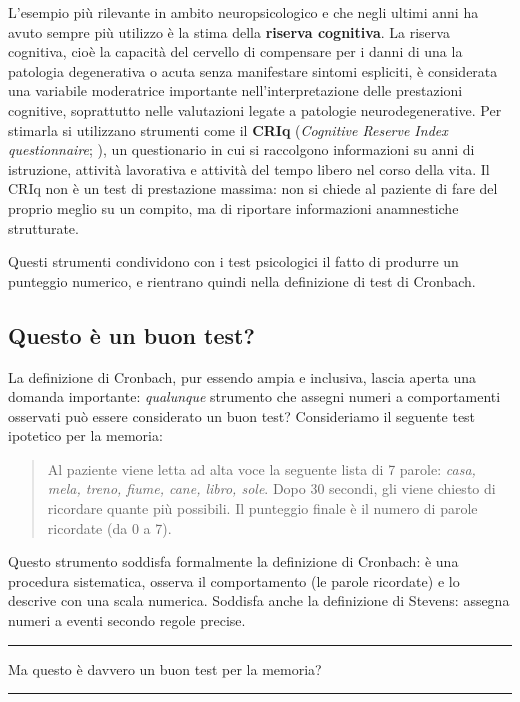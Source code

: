 \documentclass[
  italian,
  letterpaper,
  paper=A4,
  headinclude=on,
  footinclude=on,
  12pt]{scrbook}
\newenvironment{domanda}{%
  \par\medskip\noindent\rule{\linewidth}{0.4pt}\vspace{3pt}%
  \begin{center}\large\itshape
}{%
  \end{center}\vspace{-4pt}\noindent\rule{\linewidth}{0.4pt}\par\medskip
}
\begin{document}
L'esempio più rilevante in ambito neuropsicologico e che negli ultimi
anni ha avuto sempre più utilizzo è la stima della \textbf{riserva
cognitiva}. La riserva cognitiva, cioè la capacità del cervello di
compensare per i danni di una la patologia degenerativa o acuta senza
manifestare sintomi espliciti, è considerata una variabile moderatrice
importante nell'interpretazione delle prestazioni cognitive, soprattutto
nelle valutazioni legate a patologie neurodegenerative. Per stimarla si
utilizzano strumenti come il \textbf{CRIq} (\emph{Cognitive Reserve
Index questionnaire}; \cite{nucci2012cognitive}), un questionario in cui
si raccolgono informazioni su anni di istruzione, attività lavorativa e
attività del tempo libero nel corso della vita. Il CRIq non è un test di
prestazione massima: non si chiede al paziente di fare del proprio
meglio su un compito, ma di riportare informazioni anamnestiche
strutturate.

Questi strumenti condividono con i test psicologici il fatto di produrre
un punteggio numerico, e rientrano quindi nella definizione di test di
Cronbach.

\subsection{Questo è un buon test?}\label{questo-uxe8-un-buon-test}

La definizione di Cronbach, pur essendo ampia e inclusiva, lascia aperta
una domanda importante: \emph{qualunque} strumento che assegni numeri a
comportamenti osservati può essere considerato un buon test?
Consideriamo il seguente test ipotetico per la memoria:

\begin{quote}
Al paziente viene letta ad alta voce la seguente lista di 7 parole:
\emph{casa, mela, treno, fiume, cane, libro, sole}. Dopo 30 secondi, gli
viene chiesto di ricordare quante più possibili. Il punteggio finale è
il numero di parole ricordate (da 0 a 7).
\end{quote}

Questo strumento soddisfa formalmente la definizione di Cronbach: è una
procedura sistematica, osserva il comportamento (le parole ricordate) e
lo descrive con una scala numerica. Soddisfa anche la definizione di
Stevens: assegna numeri a eventi secondo regole precise.

\begin{domanda}

Ma questo è davvero un buon test per la memoria?

\end{domanda}
\end{document}
